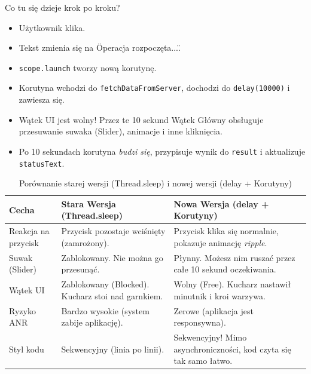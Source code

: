 Co tu się dzieje krok po kroku?
\begin{itemize}
\item Użytkownik klika.
\item Tekst zmienia się na \"Operacja rozpoczęta...\".
\item \texttt{scope.launch} tworzy nową korutynę.
\item Korutyna wchodzi do \texttt{fetchDataFromServer}, dochodzi do \texttt{delay(10000)} i zawiesza się.
\item Wątek UI jest wolny! Przez te 10 sekund Wątek Główny obsługuje przesuwanie suwaka (Slider), animacje i inne kliknięcia.
\item Po 10 sekundach korutyna \textit{budzi się}, przypisuje wynik do \texttt{result} i aktualizuje \texttt{statusText}.
\end{itemize}

\begin{table}[ht]
    \centering
    \begin{tabular}{p{3cm} p{5cm} p{5cm}}
        \hline
        \textbf{Cecha} & \textbf{Stara Wersja (Thread.sleep)} & \textbf{Nowa Wersja (delay + Korutyny)} \\
        \hline
        Reakcja na przycisk 
            & Przycisk pozostaje wciśnięty (zamrożony). 
            & Przycisk klika się normalnie, pokazuje animację \textit{ripple}. \\
        Suwak (Slider) 
            & Zablokowany. Nie można go przesunąć. 
            & Płynny. Możesz nim ruszać przez całe 10 sekund oczekiwania. \\
        Wątek UI 
            & Zablokowany (Blocked). Kucharz stoi nad garnkiem. 
            & Wolny (Free). Kucharz nastawił minutnik i kroi warzywa. \\
        Ryzyko ANR 
            & Bardzo wysokie (system zabije aplikację). 
            & Zerowe (aplikacja jest responsywna). \\
        Styl kodu 
            & Sekwencyjny (linia po linii). 
            & Sekwencyjny! Mimo asynchroniczności, kod czyta się tak samo łatwo. \\
        \hline
    \end{tabular}
    \caption{Porównanie starej wersji (Thread.sleep) i nowej wersji (delay + Korutyny)}
\end{table}